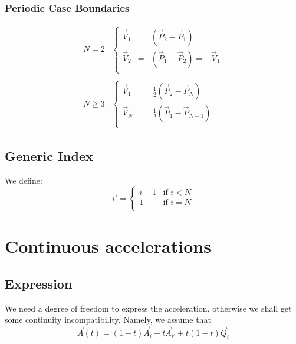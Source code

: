 \documentclass[aps,12pt]{revtex4}
\begin{document}
 
\subsubsection{Periodic Case Boundaries}

\begin{equation}
\begin{array}{rl}
N=2 &
	\left\lbrace
	\begin{array}{rcl}
	\vec{V}_1 & = &  \left( \vec{P}_2 - \vec{P}_1\right)\\
	\vec{V}_2 & = &  \left( \vec{P}_1 - \vec{P}_2\right) = -\vec{V}_1\\
	\end{array}
	\right.
	\\
	\\
	N\geq3 & 
	\left\lbrace
	\begin{array}{rcl}
	\vec{V}_1 & = & \frac{1}{2} \left( \vec{P}_2 - \vec{P}_N\right)\\
	\vec{V}_N & = & \frac{1}{2} \left( \vec{P}_1 - \vec{P}_{N-1}\right)\\
	\end{array}
	\right.
\end{array}
\end{equation}

\subsection{Generic Index}
We define:
\begin{equation}
	i' =
	\left\lbrace
	\begin{array}{rcl}
		i+1 & \mbox{if } i<N\\
		1   & \mbox{if } i=N\\
	\end{array}
	\right.
\end{equation}


\section{Continuous accelerations}

\subsection{Expression}
We need a degree of freedom to express the acceleration, otherwise we shall get some continuity incompatibility.
Namely, we assume that
\begin{equation}
	\vec{A}(t) = (1-t) \vec{A}_i + t \vec{A}_{i'} + t(1-t) \vec{Q}_i
\end{equation}
\end{document}
